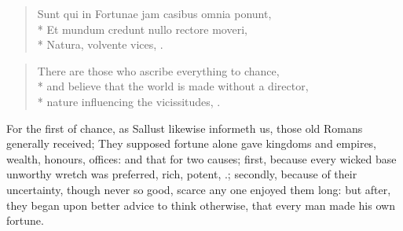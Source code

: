 {\begin{latin}
\begin{verse}
Sunt qui in Fortunae jam casibus omnia ponunt,\\*
Et mundum credunt nullo rectore moveri,\\*
Natura, volvente vices, \etc{}.
\end{verse}
\end{latin}

\begin{verse}
There are those who ascribe everything to chance,\\*
and believe that the world is made without a director,\\*
nature influencing the vicissitudes, \etc{}.
\end{verse}

For the first of chance, as Sallust likewise informeth us, those
old Romans generally received; They supposed fortune alone gave
kingdoms and empires, wealth, honours, offices: and that for two
causes; first, because every wicked base unworthy wretch was preferred,
rich, potent, \etc{}.; secondly, because of their uncertainty, though never
so good, scarce any one enjoyed them long: but after, they began upon
better advice to think otherwise, that every man made his own fortune.

}
